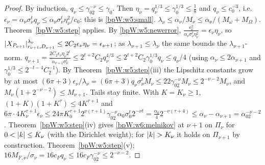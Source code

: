 \begin{proof}
\label{stepW:w6:il-small} By induction, $q_\nu\le\gamma_02^{-\nu}\le\gamma_0$. Then $\eta_\nu=q_\nu^{1/3}\le\gamma_0^{1/3}\le\frac18$
and $q_\nu\le c_0^{-3}$, i.e.\ $\epsilon_\nu=\alpha_\nu\sigma_\nu^tq_\nu\le\alpha_\nu\sigma_\nu^t\eta_\nu^2/c_0$: this is \eqref{bpW:w5:small}.
$\lambda_\nu\le\alpha_\nu/M_\nu\le\alpha_\nu/(M_\omega+M_\Omega)$. Theorem~\ref{bpW:w5:step} applies.
\label{stepW:w6:il-err} By \eqref{bpW:w5:newerror}, $\frac{\epsilon_\nu^2}{\alpha_\nu\sigma_\nu^t\eta_\nu^2}=\epsilon_\nu\eta_\nu$, so
$\lvert X_{P_{\nu+1}}\rvert^{\lambda_\nu}_{r_{\nu+1},D_{\nu+1}}\le2C_2\epsilon_\nu\eta_\nu=\epsilon_{\nu+1}$; as $\lambda_{\nu+1}\le\lambda_\nu$ the same bounds the
$\lambda_{\nu+1}$-norm. $q_{\nu+1}=\frac{2C_2\epsilon_\nu\eta_\nu2^t}{\alpha_{\nu+1}\sigma_\nu^t}\le2^{t+2}C_2q_\nu^{4/3}\le2^{t+2}C_2\gamma_0^{1/3}q_\nu\le q_\nu/4$
(using $\alpha_\nu\le2\alpha_{\nu+1}$ and $\gamma_0^{1/3}\le2^{-t-4}C_2^{-1}$).
\label{stepW:w6:il-lip} By Theorem~\ref{bpW:w5:step}(iii) the Lipschitz constants grow by at most
$(6\pi+3)\epsilon_\nu/\lambda_\nu=(6\pi+3)q_\nu\sigma_\nu^tM_\nu\le22\gamma_02^{-\nu}M_\nu\le2^{-\nu-2}M_\nu$, and
$M_\nu(1+2^{-\nu-2})\le M_{\nu+1}$. Tails stay finite.
\label{stepW:w6:il-div} With $K=K_\nu\ge1$, $(1+K)(1+K^\tau)\le4K^{\tau+1}$ and
$6\pi\cdot4K_\nu^{\tau+1}\epsilon_\nu\le24\pi K_0^{\tau+1}2^{\nu(\tau+1)}\gamma_02^{-\nu}\alpha_0\sigma_0^t2^{-\nu t}=\frac{\alpha_0}42^{-\nu(\tau+4)}\le\alpha_\nu-\alpha_{\nu+1}=\alpha_02^{-\nu-2}$.
Theorem~\ref{bpW:w5:step}(iv) gives \eqref{bpW:w6:melnikov} at $\nu+1$ on $\Pi_\nu$ for $0<\lvert k\rvert\le K_\nu$ (with the Dirichlet weight);
for $\lvert k\rvert>K_\nu$ it holds on $\Pi_{\nu+1}$ by construction.
\label{stepW:w6:il-tr} Theorem~\ref{bpW:w5:step}(v); $16M_{F,\nu}/\sigma_\nu=16c_Fq_\nu\le16c_F\gamma_02^{-\nu}\le2^{-\nu-2}$.
\end{proof}

